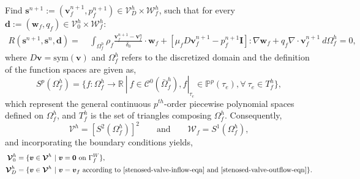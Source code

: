 \documentclass[3p]{elsarticle}
\begin{document}
Find $\boldsymbol{s}^{n+1}
:= ( \boldsymbol{v}_f^{n+1}, p_f^{n+1} ) \in \boldsymbol{\mathcal{V}}_D^h \times \mathcal{W}_f^h$,
such that for every
$\boldsymbol{d} := ( \boldsymbol{w}_f, q_f ) \in \boldsymbol{\mathcal{V}}_0^h \times \mathcal{W}_f^h$:
\begin{equation}
    \begin{split}
        R ( \boldsymbol{s}^{n+1}, \boldsymbol{s}^n, \boldsymbol{d} )
        =~&\int_{\Omega_f^h} \rho_f \frac{\boldsymbol{v}_f^{n+1} - \boldsymbol{v}_f^n}{\delta_0} \cdot \boldsymbol{w}_f
        + \left[
            \mu_f D \boldsymbol{v}_f^{n+1}
            - p_f^{n+1} \boldsymbol{I}
        \right] : \nabla \boldsymbol{w}_f
        + q_f \nabla \cdot \boldsymbol{v}_f^{n+1}~d\Omega_f^h
        = 0,
    \end{split}
    \label{stenosed-valve-stokes-weak-form-eqn}
\end{equation}
where $D \boldsymbol{v} = \text{sym} \left( \boldsymbol{v} \right)$
and $\Omega_f^h$ refers to the discretized domain
and the definition of the function spaces are given as,
\begin{equation}
    S^p (\Omega_f^h)
    = \{ f : \Omega_f^h \rightarrow \mathbb{R}
    ~|~f \in \mathcal{C}^0 (\bar{\Omega}_f^h),
    f|_{\tau_e} \in \mathbb{P}^p (\tau_e), \forall~\tau_e \in T_f^h
    \},
    \label{stenosed-valve-stokes-function-spaces-eqn}
\end{equation}
which represent the general continuous $p^{th}$-order piecewise polynomial spaces
defined on $\Omega_f^h$,
and $T_f^h$ is the set of triangles composing $\Omega_f^h$.
Consequently,
\begin{equation}
    \boldsymbol{\mathcal{V}}^h = [ S^2 (\Omega_f^h) ]^2
    \qquad \text{and} \qquad
    \mathcal{W}_f = S^1 (\Omega_f^h),
    \label{stenosed-valve-stokes-test-spaces-eqn}
\end{equation}
and incorporating the boundary conditions yields,
\begin{align}
    \boldsymbol{\mathcal{V}}_0^h
    &= \{ \boldsymbol{v} \in \boldsymbol{\mathcal{V}}^h
    ~|~\boldsymbol{v} = \boldsymbol{0} \text{ on } \Gamma_f^W \}, \\
    \boldsymbol{\mathcal{V}}_D^h
    &= \{ \boldsymbol{v} \in \boldsymbol{\mathcal{V}}^h
    ~|~\boldsymbol{v} = \boldsymbol{v}_f
    \text{ according to \eqref{stenosed-valve-inflow-eqn}
    and \eqref{stenosed-valve-outflow-eqn}} \}.
    \label{stenosed-valve-stokes-test-spaces-bc-eqn}
\end{align}
\end{document}
